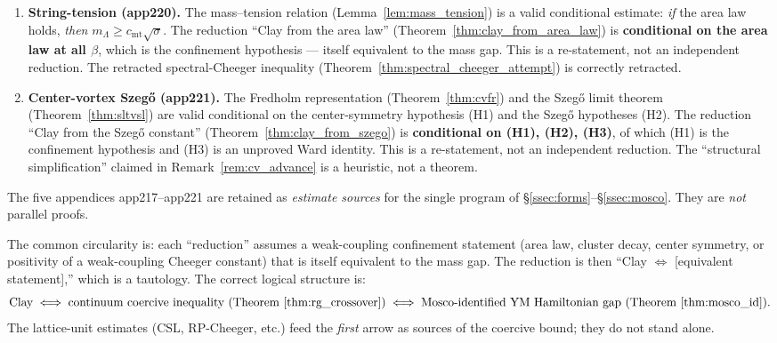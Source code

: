 \begin{theorem}
\begin{enumerate}
\item \textbf{String-tension (app220).} The mass--tension relation
(Lemma~\ref{lem:mass_tension}) is a valid conditional estimate:
\emph{if} the area law holds, \emph{then}
$m_{\Lambda}\ge c_{\mathrm{mt}}\sqrt{\sigma}$. The reduction
``Clay from the area law'' (Theorem~\ref{thm:clay_from_area_law})
is \textbf{conditional on the area law at all $\beta$}, which is
the confinement hypothesis --- itself equivalent to the mass gap.
This is a re-statement, not an independent reduction. The
retracted spectral-Cheeger inequality
(Theorem~\ref{thm:spectral_cheeger_attempt}) is correctly
retracted.

\item \textbf{Center-vortex Szeg\H{o} (app221).} The Fredholm
representation (Theorem~\ref{thm:cvfr}) and the Szeg\H{o} limit
theorem (Theorem~\ref{thm:sltvsl}) are valid conditional on the
center-symmetry hypothesis (H1) and the Szeg\H{o} hypotheses (H2).
The reduction ``Clay from the Szeg\H{o} constant''
(Theorem~\ref{thm:clay_from_szego}) is \textbf{conditional on (H1),
(H2), (H3)}, of which (H1) is the confinement hypothesis and (H3)
is an unproved Ward identity. This is a re-statement, not an
independent reduction. The ``structural simplification'' claimed
in Remark~\ref{rem:cv_advance} is a heuristic, not a theorem.
\end{enumerate}
The five appendices app217--app221 are retained as \emph{estimate
sources} for the single program of \S\ref{ssec:forms}--\S\ref{ssec:mosco}.
They are \emph{not} parallel proofs.
\end{theorem}

\begin{remark}
\label{rem:circularity}
The common circularity is: each ``reduction'' assumes a
weak-coupling confinement statement (area law, cluster decay,
center symmetry, or positivity of a weak-coupling Cheeger constant)
that is itself equivalent to the mass gap. The reduction is then
``Clay $\Leftrightarrow$ [equivalent statement],'' which is a
tautology. The correct logical structure is:
\[
  \text{Clay} \;\Longleftrightarrow\;
  \text{continuum coercive inequality (Theorem~\ref{thm:rg_crossover})}
  \;\Longleftrightarrow\;
  \text{Mosco-identified YM Hamiltonian gap (Theorem~\ref{thm:mosco_id})}.
\]
The lattice-unit estimates (CSL, RP-Cheeger, etc.) feed the
\emph{first} arrow as sources of the coercive bound; they do not
stand alone.
\end{remark}

